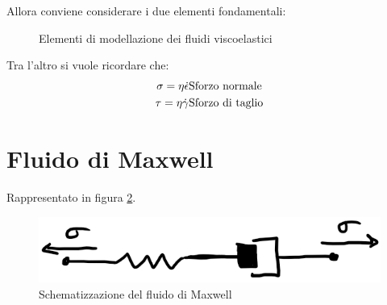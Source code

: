 Allora conviene considerare i due elementi fondamentali:

\begin{figure}
\centering
{}\quad
{}	
\caption{Elementi di modellazione dei fluidi viscoelastici}
\label{fig:FluidiViscoelastici}	
\end{figure}

Tra l'altro si vuole ricordare che:
\begin{equation}
\begin{split}
\sigma = \eta \dot{\epsilon} &\textup{Sforzo normale}\\
\tau = \eta \dot{\gamma} &\textup{Sforzo di taglio}
\end{split}
\end{equation}

\section{Fluido di Maxwell}
Rappresentato in figura \ref{fig:FluidoMaxwell}.
\begin{figure}
\centering
\includegraphics[width = \textwidth]{gfx/FluidoMaxwell}
\caption{Schematizzazione del fluido di Maxwell}
\label{fig:FluidoMaxwell}
\end{figure}

